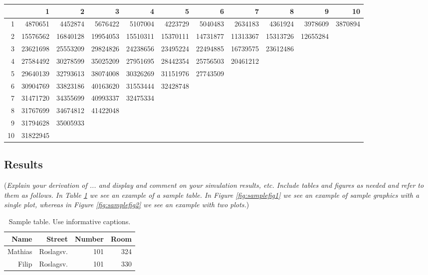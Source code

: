 \documentclass[11pt]{article}
\begin{document}
\begin{table}[ht]
\centering
\begin{tabular}{rrrrrrrrrrr}
  \hline
 & 1 & 2 & 3 & 4 & 5 & 6 & 7 & 8 & 9 & 10 \\ 
  \hline
1 & 4870651 & 4452874 & 5676422 & 5107004 & 4223729 & 5040483 & 2634183 & 4361924 & 3978609 & 3870894 \\ 
  2 & 15576562 & 16840128 & 19954053 & 15510311 & 15370111 & 14731877 & 11313367 & 15313726 & 12655284 &  \\ 
  3 & 23621698 & 25553209 & 29824826 & 24238656 & 23495224 & 22494885 & 16739575 & 23612486 &  &  \\ 
  4 & 27584492 & 30278599 & 35025209 & 27951695 & 28442354 & 25756503 & 20461212 &  &  &  \\ 
  5 & 29640139 & 32793613 & 38074008 & 30326269 & 31151976 & 27743509 &  &  &  &  \\ 
  6 & 30904769 & 33823186 & 40163620 & 31553444 & 32428748 &  &  &  &  &  \\ 
  7 & 31471720 & 34355699 & 40993337 & 32475334 &  &  &  &  &  &  \\ 
  8 & 31767699 & 34674812 & 41422048 &  &  &  &  &  &  &  \\ 
  9 & 31794628 & 35005933 &  &  &  &  &  &  &  &  \\ 
  10 & 31822945 &  &  &  &  &  &  &  &  &  \\ 
   \hline
\end{tabular}
\end{table}




\subsection*{Results}

({\it Explain your derivation of ... and display and comment on your simulation results, etc. Include tables and figures as needed and refer to them as follows. In Table \ref{tab:sampletab} we see an example of a sample table. In Figure \ref{fig:samplefig1} we see an example of sample graphics with a single plot, whereas in Figure \ref{fig:samplefig2} we see an example with two plots.}) 

\begin{table}[!ht]
\center
\begin{tabular}{rrr|r}
Name & Street & Number & Room\\ 
\hline
Mathias & Roslagsv. & 101 & 324\\
Filip & Roslagsv. & 101 & 330\\
\hline
\end{tabular}
\caption{Sample table. Use informative captions.} \label{tab:sampletab}
\end{table}
\end{document}
